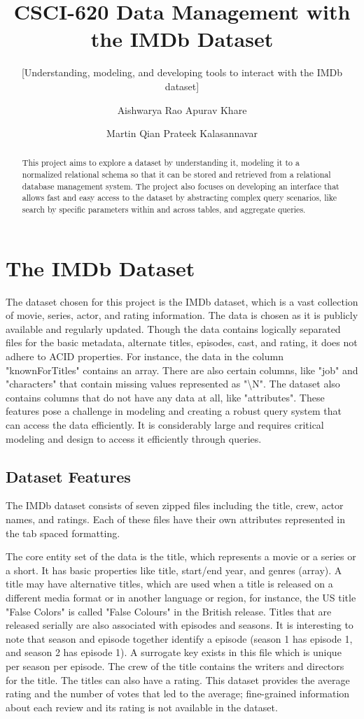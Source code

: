 \documentclass{sig-alternate}
\title{CSCI-620 Data Management with the IMDb Dataset}
\subtitle{[Understanding, modeling, and developing tools to interact with the IMDb dataset]}
\author
{
\alignauthor
  Aishwarya Rao
  \email{ar2711@rit.edu}
\alignauthor
  Apurav Khare
  \email{ak2816@rit.edu}
\and
\alignauthor
  Martin Qian
  \email{jq3513@rit.edu}
\alignauthor
  Prateek Kalasannavar
  \email{pk6685@rit.edu}
}
\begin{document}
\maketitle
\begin{abstract}
This project aims to explore a dataset by understanding it, modeling it to a normalized relational schema so that it can be stored and retrieved from a relational database management system. The project also focuses on developing an interface that allows fast and easy access to the dataset by abstracting complex query scenarios, like search by specific parameters within and across tables, and aggregate queries.
\end{abstract}

\section{The IMDb Dataset}
The dataset chosen for this project is the IMDb dataset, which is a vast collection of movie, series, actor, and rating information. The data is chosen as it is publicly available and regularly updated. Though the data contains logically separated files for the basic metadata, alternate titles, episodes, cast, and rating, it does not adhere to ACID properties. For instance, the data in the column "knownForTitles" contains an array. There are also certain columns, like "job" and "characters" that contain missing values represented as "\textbackslash N". The dataset also contains columns that do not have any data at all, like "attributes". These features pose a challenge in modeling and creating a robust query system that can access the data efficiently. It is considerably large and requires critical modeling and design to access it efficiently through queries.
\subsection{Dataset Features}
The IMDb dataset consists of seven zipped files including the title, crew, actor names, and ratings. Each of these files have their own attributes represented in the tab spaced formatting.

The core entity set of the data is the title, which represents a movie or a series or a short. It has basic properties like title, start/end year, and genres (array). A title may have alternative titles, which are used when a title is released on a different media format or in another language or region, for instance, the US title "False Colors" is called "False Colours" in the British release. Titles that are released serially are also associated with episodes and seasons. It is interesting to note that season and episode together identify a episode (season 1 has episode 1, and season 2 has episode 1). A surrogate key exists in this file which is unique per season per episode. The crew of the title contains the writers and directors for the title. The titles can also have a rating. This dataset provides the average rating and the number of votes that led to the average; fine-grained information about each review and its rating is not available in the dataset.
\end{document}
